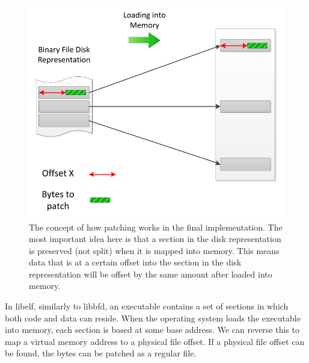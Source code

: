 \begin{figure}[H]
 \centering
 \includegraphics{Loading_Binary.pdf}
 \caption{The concept of how patching works in the final implementation. The most important idea here is that a section in the disk representation is preserved (not split) when it is mapped into memory. This means data that is at a certain offset into the section in the disk representation will be offset by the same amount after loaded into memory.}
\label{fig:Loading_Binary}
\end{figure}
 
In libelf, similarly to libbfd, an executable contains a set of sections in which both code and data can reside. When the operating system loads the executable into memory, each section is based at some base address. We can reverse this to map a virtual memory address to a physical file offset. If a physical file offset can be found, the bytes can be patched as a regular file.

